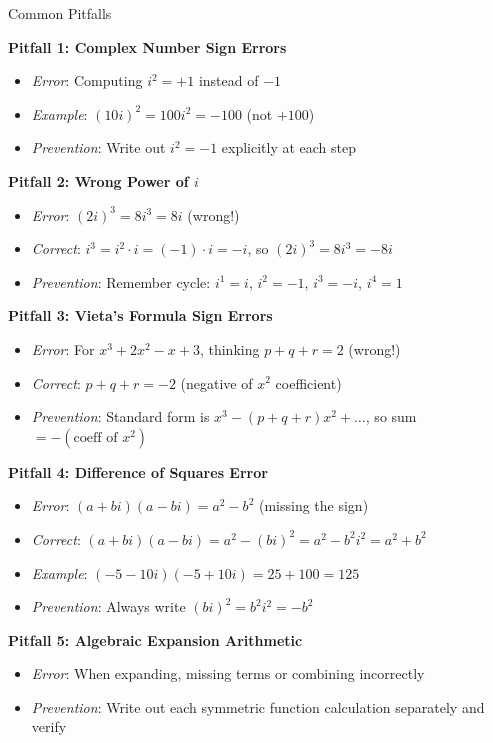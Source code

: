 \documentclass[12pt]{article}
\begin{document}
\begin{warningbox}{Common Pitfalls}

\textbf{Pitfall 1: Complex Number Sign Errors}
\begin{itemize}
    \item \textit{Error}: Computing $i^2 = +1$ instead of $-1$
    \item \textit{Example}: $(10i)^2 = 100i^2 = -100$ (not $+100$)
    \item \textit{Prevention}: Write out $i^2 = -1$ explicitly at each step
\end{itemize}

\textbf{Pitfall 2: Wrong Power of $i$}
\begin{itemize}
    \item \textit{Error}: $(2i)^3 = 8i^3 = 8i$ (wrong!)
    \item \textit{Correct}: $i^3 = i^2 \cdot i = (-1) \cdot i = -i$, so $(2i)^3 = 8i^3 = -8i$
    \item \textit{Prevention}: Remember cycle: $i^1 = i$, $i^2 = -1$, $i^3 = -i$, $i^4 = 1$
\end{itemize}

\textbf{Pitfall 3: Vieta's Formula Sign Errors}
\begin{itemize}
    \item \textit{Error}: For $x^3 + 2x^2 - x + 3$, thinking $p + q + r = 2$ (wrong!)
    \item \textit{Correct}: $p + q + r = -2$ (negative of $x^2$ coefficient)
    \item \textit{Prevention}: Standard form is $x^3 - (p+q+r)x^2 + \ldots$, so sum $= -(\text{coeff of }x^2)$
\end{itemize}

\textbf{Pitfall 4: Difference of Squares Error}
\begin{itemize}
    \item \textit{Error}: $(a + bi)(a - bi) = a^2 - b^2$ (missing the sign)
    \item \textit{Correct}: $(a + bi)(a - bi) = a^2 - (bi)^2 = a^2 - b^2i^2 = a^2 + b^2$
    \item \textit{Example}: $(-5 - 10i)(-5 + 10i) = 25 + 100 = 125$
    \item \textit{Prevention}: Always write $(bi)^2 = b^2i^2 = -b^2$
\end{itemize}

\textbf{Pitfall 5: Algebraic Expansion Arithmetic}
\begin{itemize}
    \item \textit{Error}: When expanding, missing terms or combining incorrectly
    \item \textit{Prevention}: Write out each symmetric function calculation separately and verify
\end{itemize}


\end{warningbox}
\end{document}
